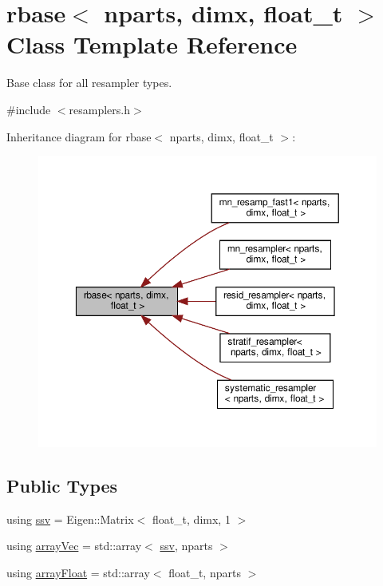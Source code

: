 \hypertarget{classrbase}{}\section{rbase$<$ nparts, dimx, float\+\_\+t $>$ Class Template Reference}
\label{classrbase}


Base class for all resampler types.  




{\ttfamily \#include $<$resamplers.\+h$>$}



Inheritance diagram for rbase$<$ nparts, dimx, float\+\_\+t $>$\+:
\nopagebreak
\begin{figure}[H]
\begin{center}
\leavevmode
\includegraphics[width=350pt]{classrbase__inherit__graph}
\end{center}
\end{figure}
\subsection*{Public Types}
\begin{DoxyCompactItemize}
\item 
using \hyperlink{classrbase_ae20e0b8df15aa109252f57ecbf1f20f8}{ssv} = Eigen\+::\+Matrix$<$ float\+\_\+t, dimx, 1 $>$
\item 
using \hyperlink{classrbase_aa12fc826befa6ba0647b5f59ebc396ee}{array\+Vec} = std\+::array$<$ \hyperlink{classrbase_ae20e0b8df15aa109252f57ecbf1f20f8}{ssv}, nparts $>$
\item 
using \hyperlink{classrbase_a6f76bef853e508cb5b6f546d231b06f5}{array\+Float} = std\+::array$<$ float\+\_\+t, nparts $>$
\end{DoxyCompactItemize}
